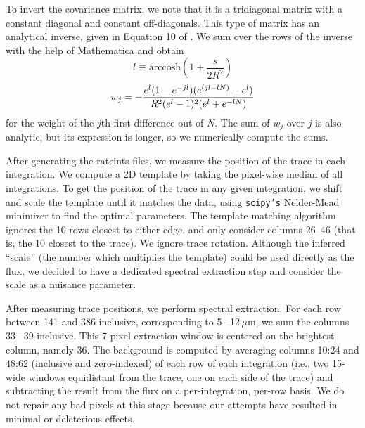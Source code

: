 \documentclass[pdflatex,sn-standardnature]{sn-jnl}%
\begin{document}
To invert the covariance matrix, we note that it is a tridiagonal matrix with a constant diagonal and constant off-diagonals.  This type of matrix has an analytical inverse, given in Equation 10 of \cite{hu_1996}.  We sum over the rows of the inverse with the help of Mathematica and obtain
\begin{equation}
    l \equiv \mathrm{arccosh}(1 + \frac{s}{2R^2})\end{equation}
\begin{equation}
    w_j = -\frac{e^l (1-e^{-jl}) (e^{(jl-lN)} - e^l)}{R^2 (e^l - 1)^2 (e^l + e^{-lN})}\\
\end{equation}
for the weight of the $j$th first difference out of $N$.  The sum of $w_j$ over $j$ is also analytic, but its expression is longer, so we numerically compute the sums.







After generating the rateints files, we measure the position of the trace in each integration.  We compute a 2D template by taking the pixel-wise median of all integrations.  To get the position of the trace in any given integration, we shift and scale the template until it matches the data, using \texttt{scipy's} Nelder-Mead minimizer to find the optimal parameters.  The template matching algorithm ignores the 10 rows closest to either edge, and only consider columns 26--46 (that is, the 10 closest to the trace).  We ignore trace rotation.  Although the inferred ``scale'' (the number which multiplies the template) could be used directly as the flux, we decided to have a dedicated spectral extraction step and consider the scale as a nuisance parameter.

After measuring trace positions, we perform spectral extraction.  For each row between 141 and 386 inclusive, corresponding to 5\,--\,12\,$\mu$m, we sum the columns 33\,--\,39 inclusive.  This 7-pixel extraction window is centered on the brightest column, namely 36.  The background is computed by averaging columns 10:24 and 48:62 (inclusive and zero-indexed) of each row of each integration (i.e., two 15-wide windows equidistant from the trace, one on each side of the trace) and subtracting the result from the flux on a per-integration, per-row basis.  We do not repair any bad pixels at this stage because our attempts have resulted in minimal or deleterious effects.
\end{document}
